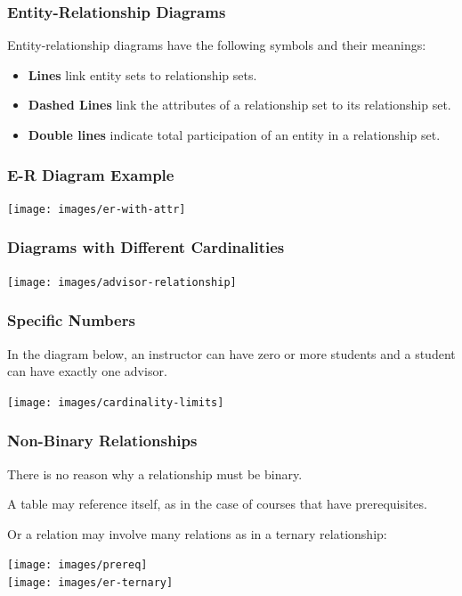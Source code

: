 \begin{frame}
\frametitle{Entity-Relationship Diagrams}

Entity-relationship diagrams have the following symbols and their meanings:

\begin{itemize}
	\item \textbf{Lines} link entity sets to relationship sets.
	\item \textbf{Dashed Lines} link the attributes of a relationship set to its relationship set.
	\item \textbf{Double lines} indicate total participation of an entity in a relationship set.
\end{itemize}

\end{frame}



\begin{frame}
\frametitle{E-R Diagram Example}

\begin{center}
\texttt{[image: images/er-with-attr]}\\
\end{center}


\end{frame}



\begin{frame}
\frametitle{Diagrams with Different Cardinalities}

\begin{center}
\texttt{[image: images/advisor-relationship]}
\end{center}


\end{frame}


\begin{frame}
\frametitle{Specific Numbers}

In the diagram below, an instructor can have zero or more students and a student can have exactly one advisor.

\begin{center}
\texttt{[image: images/cardinality-limits]}
\end{center}

\end{frame}



\begin{frame}
\frametitle{Non-Binary Relationships}

There is no reason why a relationship must be binary.

A table may reference itself, as in the case of courses that have prerequisites.

Or a relation may involve many relations as in a ternary relationship:

\begin{center}
\texttt{[image: images/prereq]}\\
\texttt{[image: images/er-ternary]}
\end{center}

\end{frame}

